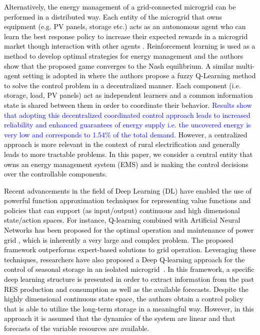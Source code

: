 \documentclass{article}
\begin{document}
	\textcolor{black}{Alternatively, the energy management of a grid-connected microgrid can be performed in a distributed way. Each entity of the microgrid that owns equipment (e.g. PV panels, storage etc.) acts as an autonomous agent who can learn the best response policy to increase their expected rewards in a microgrid market though interaction with other agents \cite{foruzan2018reinforcement}. Reinforcement learning is used as a method to develop optimal strategies for energy management and the authors show that the proposed game converges to the Nash equilibrium. A similar multi-agent setting is adopted in \cite{KOFINAS201853} where the authors propose a fuzzy Q-Learning method to solve the control problem in a decentralized manner. Each component (i.e. storage, load, PV panels) act as independent learners and a common information state is shared between them in order to coordinate their behavior. \textcolor{blue}{Results show that adopting this decentralized coordinated control approach leads to increased reliability and enhanced  guarantees of energy supply i.e. the uncovered energy is very low and corresponds to 1.54\% of the total demand.} However, a centralized approach is more relevant in the context of rural electrification and generally leads to more tractable problems. In this paper, we consider a central entity that owns an energy management system (EMS) and is making the control decisions over the controllable components.}
	
	\textcolor{black}{Recent advancements in the field of Deep Learning (DL) have enabled the use of powerful function approximation techniques for representing value functions and policies that can support (as input/output) continuous and high dimensional state/action spaces. For instance,  Q-learning combined with Artificial Neural Networks has been proposed for the optimal operation and maintenance of power grid \cite{ROCCHETTA2019291}, which is inherently a very large and complex problem. The proposed framework outperforms expert-based solutions to grid operation. Leveraging these techniques, researchers have also proposed a Deep Q-learning approach for the control of seasonal storage in an isolated microgrid~\cite{franccois2016deep}. In this framework, a specific deep learning structure is presented in order to extract information from the past RES production and consumption as well as the available forecasts. Despite the highly dimensional continuous state space, the authors obtain a control policy that is able to utilize the long-term storage in a meaningful way. However, in this approach it is assumed that the dynamics of the system are linear and that forecasts of the variable resources are available.}
	
\end{document}
